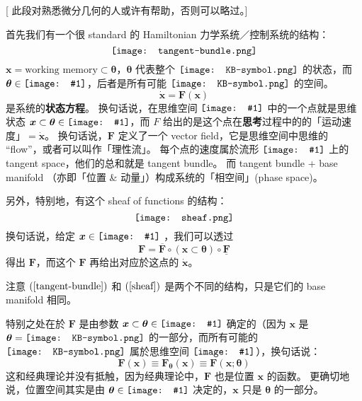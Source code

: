 \documentclass[orivec]{llncs}
\newcommand{\vect}[1]{\boldsymbol{#1}}
\newcommand*\KB{\vcenter{\hbox{\texttt{[image: KB-symbol.png]}}}}
\newcommand*\NewSym[1]{\vcenter{\hbox{\texttt{[image: \#1]}}}}
\begin{document}
[ 此段对熟悉微分几何的人或许有帮助，否则可以略过。]

首先我们有一个很 standard 的 Hamiltonian 力学系统／控制系统的结构：
\begin{equation}
\label{tangent-bundle}
\vcenter{\hbox{\texttt{[image: tangent-bundle.png]}}}
\end{equation}
$\vect{x} = \mbox{working memory} \subset \vect{\theta}$，$\vect{\theta}$ 代表整个 $\KB$ 的状态，而 $\vect{\theta} \in \NewSym{bbTheta.png}$，后者是所有可能 $\KB$ 的空间。
\begin{equation}
\dot{\vect{x}} = \vect{F}(\vect{x})
\end{equation}
是系统的\textbf{状态方程}。 换句话说，在思维空间 $\NewSym{bbTheta}$ 中的一个点就是思维状态 $\vect{x} \subset \vect{\theta} \in \NewSym{bbTheta}$，而 $F$ 给出的是这个点在\textbf{思考}过程中的的「运动速度」$= \dot{\vect{x}}$。  换句话说，$\vect{F}$ 定义了一个 vector field，它是思维空间中思维的 ``flow''，或者可以叫作「理性流」。  每个点的速度属於流形 $\NewSym{bbTheta}$ 上的 tangent space，他们的总和就是 tangent bundle。  而 tangent bundle + base manifold （亦即「位置 \& 动量」）构成系统的「相空间」(phase space)。

另外，特别地，有这个 sheaf of functions 的结构：
\begin{equation}
\label{sheaf}
\vcenter{\hbox{\texttt{[image: sheaf.png]}}}
\end{equation}
换句话说，给定 $\vect{x} \in \NewSym{bbTheta}$ ，我们可以透过
\begin{equation}
\vect{F} = \overline{\vect{F}} \circ (\vect{x} \subset \vect{\theta}) \circ \underline{\vect{F}}
\end{equation}
得出 $\vect{F}$，而这个 $\vect{F}$ 再给出对应於这点的 $\dot{\vect{x}}$。

注意 $(\ref{tangent-bundle})$ 和 $(\ref{sheaf})$ 是两个不同的结构，只是它们的 base manifold 相同。 

特别之处在於 $\vect{F}$ 是由参数 $\vect{x} \subset \vect{\theta} \in \NewSym{bbTheta}$ 确定的（因为 $\vect{x}$ 是 $\vect{\theta} = \KB$ 的一部分，而所有可能的 $\KB$ 属於思维空间 $\NewSym{bbTheta}$），换句话说：
\begin{equation}
\vect{F}(\vect{x}) \equiv \vect{F}_{\vect{\theta}}(\vect{x}) \equiv \vect{F}(\vect{x} ; \vect{\theta})
\end{equation}
这和经典理论并没有抵触，因为经典理论中，$\vect{F}$ 也是位置 $\vect{x}$ 的函数。  更确切地说，位置空间其实是由 $\vect{\theta} \in \NewSym{bbTheta}$ 决定的，$\vect{x}$ 只是 $\vect{\theta}$ 的一部分。
\end{document}
